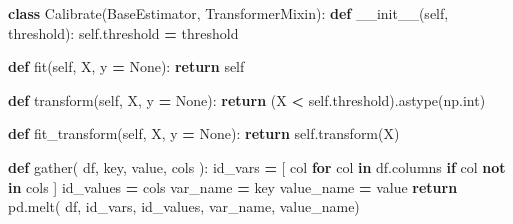 \documentclass[
]{article}
\newenvironment{Shaded}{\begin{snugshade}}{\end{snugshade}}
\newcommand{\BuiltInTok}[1]{#1}
\newcommand{\ControlFlowTok}[1]{\textcolor[rgb]{0.13,0.29,0.53}{\textbf{#1}}}
\newcommand{\FunctionTok}[1]{\textcolor[rgb]{0.00,0.00,0.00}{#1}}
\newcommand{\KeywordTok}[1]{\textcolor[rgb]{0.13,0.29,0.53}{\textbf{#1}}}
\newcommand{\NormalTok}[1]{#1}
\newcommand{\OperatorTok}[1]{\textcolor[rgb]{0.81,0.36,0.00}{\textbf{#1}}}
\newcommand{\VariableTok}[1]{\textcolor[rgb]{0.00,0.00,0.00}{#1}}
\begin{document}
\newpage

\begin{Shaded}
\begin{Highlighting}[]
\KeywordTok{class}\NormalTok{ Calibrate(BaseEstimator, TransformerMixin):}
    \KeywordTok{def} \FunctionTok{\_\_init\_\_}\NormalTok{(}\VariableTok{self}\NormalTok{, threshold):}
        \VariableTok{self}\NormalTok{.threshold }\OperatorTok{=}\NormalTok{ threshold}
        
    \KeywordTok{def}\NormalTok{ fit(}\VariableTok{self}\NormalTok{, X, y }\OperatorTok{=} \VariableTok{None}\NormalTok{):}
        \ControlFlowTok{return} \VariableTok{self}
    
    \KeywordTok{def}\NormalTok{ transform(}\VariableTok{self}\NormalTok{, X, y }\OperatorTok{=} \VariableTok{None}\NormalTok{):}
        \ControlFlowTok{return}\NormalTok{ (X }\OperatorTok{\textless{}} \VariableTok{self}\NormalTok{.threshold).astype(np.}\BuiltInTok{int}\NormalTok{)}
    
    \KeywordTok{def}\NormalTok{ fit\_transform(}\VariableTok{self}\NormalTok{, X, y }\OperatorTok{=} \VariableTok{None}\NormalTok{):}
        \ControlFlowTok{return} \VariableTok{self}\NormalTok{.transform(X)}
\end{Highlighting}
\end{Shaded}

\begin{Shaded}
\begin{Highlighting}[]
\KeywordTok{def}\NormalTok{ gather( df, key, value, cols ):}
\NormalTok{    id\_vars }\OperatorTok{=}\NormalTok{ [ col }\ControlFlowTok{for}\NormalTok{ col }\KeywordTok{in}\NormalTok{ df.columns }\ControlFlowTok{if}\NormalTok{ col }\KeywordTok{not} \KeywordTok{in}\NormalTok{ cols ]}
\NormalTok{    id\_values }\OperatorTok{=}\NormalTok{ cols}
\NormalTok{    var\_name }\OperatorTok{=}\NormalTok{ key}
\NormalTok{    value\_name }\OperatorTok{=}\NormalTok{ value}
    \ControlFlowTok{return}\NormalTok{ pd.melt( df, id\_vars, id\_values, var\_name, value\_name)}
\end{Highlighting}
\end{Shaded}

\newpage
\end{document}
